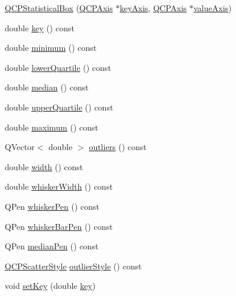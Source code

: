 \begin{DoxyCompactItemize}
\item 
\hyperlink{class_q_c_p_statistical_box_a75c2b3e7fcd0741cc981693a2ba63b27}{Q\-C\-P\-Statistical\-Box} (\hyperlink{class_q_c_p_axis}{Q\-C\-P\-Axis} $\ast$\hyperlink{class_q_c_p_abstract_plottable_a72c7a09c22963f2c943f07112b311103}{key\-Axis}, \hyperlink{class_q_c_p_axis}{Q\-C\-P\-Axis} $\ast$\hyperlink{class_q_c_p_abstract_plottable_a3106f9d34d330a6097a8ec5905e5b519}{value\-Axis})
\item 
double \hyperlink{class_q_c_p_statistical_box_a767af754f39872d6308b900a0d1758ca}{key} () const 
\item 
double \hyperlink{class_q_c_p_statistical_box_acd94c05d59c05d9146d3b60d9f52df82}{minimum} () const 
\item 
double \hyperlink{class_q_c_p_statistical_box_af9c4a98f5ca95b5a5a8b140f57b64ace}{lower\-Quartile} () const 
\item 
double \hyperlink{class_q_c_p_statistical_box_a44abdee617fe0bca72e6a2ea3fd492de}{median} () const 
\item 
double \hyperlink{class_q_c_p_statistical_box_abd15951907b54343a89b1f7feddcb7a7}{upper\-Quartile} () const 
\item 
double \hyperlink{class_q_c_p_statistical_box_a928bcf07dd2176affad91d85be03172f}{maximum} () const 
\item 
Q\-Vector$<$ double $>$ \hyperlink{class_q_c_p_statistical_box_a73eaa2f800b47e3832d7f09ad1f3b7e0}{outliers} () const 
\item 
double \hyperlink{class_q_c_p_statistical_box_a0733a7bd575fc5929ce6d507bcc2a04c}{width} () const 
\item 
double \hyperlink{class_q_c_p_statistical_box_ab02392dd54ebd6dd7c8d6fb5c3f0421c}{whisker\-Width} () const 
\item 
Q\-Pen \hyperlink{class_q_c_p_statistical_box_a26d2b34cbaeac2dd639bb21590f317c4}{whisker\-Pen} () const 
\item 
Q\-Pen \hyperlink{class_q_c_p_statistical_box_ab151a727fb0b6396acb3b6c72505a4fe}{whisker\-Bar\-Pen} () const 
\item 
Q\-Pen \hyperlink{class_q_c_p_statistical_box_a96aa0bb650b83e9dfa0387ca4db7fa05}{median\-Pen} () const 
\item 
\hyperlink{class_q_c_p_scatter_style}{Q\-C\-P\-Scatter\-Style} \hyperlink{class_q_c_p_statistical_box_ab7e5a68bce97ba43a7ff18e074c4dcad}{outlier\-Style} () const 
\item 
void \hyperlink{class_q_c_p_statistical_box_a84a1c6d34b2f9af40bca0c527d51e97e}{set\-Key} (double \hyperlink{class_q_c_p_statistical_box_a767af754f39872d6308b900a0d1758ca}{key})

\end{DoxyCompactItemize}

